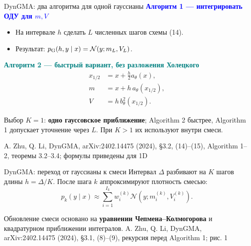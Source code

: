 \documentclass[10pt,aspectratio=169]{beamer}
\newcommand{\dynsrc}[1]{\vfill{\tiny\color{graytext}A. Zhu, Q. Li, DynGMA, arXiv:2402.14475 (2024), #1}}
\begin{document}
\begin{frame}{DynGMA: два алгоритма для одной гауссианы}
\vspace{0.10cm}
\textcolor{blue}{\bfseries Алгоритм 1 --- интегрировать ОДУ для $m,V$}
\begin{itemize}\setlength\itemsep{0.09cm}
\item На интервале $h$ сделать $L$ численных шагов схемы (14).
\item Результат: $p_{\rm G}(h,y\mid x)=\mathcal N(y;m_L,V_L)$.
\end{itemize}
\vspace{0.13cm}
\textcolor{teal}{\bfseries Алгоритм 2 --- быстрый вариант, без разложения Холецкого}
\[
\boxed{\begin{aligned}
 x_{1/2}&=x+\frac{h}{2}a_\theta(x),\\[-2pt]
 m&=x+h\,a_\theta(x_{1/2}),\\[-2pt]
 V&=h\,b_\theta^2(x_{1/2}).
\end{aligned}}
\]
\vspace{-0.08cm}
\begin{block}{Выбор}
$K=1$: \textbf{одно гауссовское приближение}; Algorithm 2 быстрее, Algorithm 1 допускает уточнение через $L$. При $K>1$ их используют внутри смеси.
\end{block}
\dynsrc{\S 3.2, (14)--(15), Algorithm 1--2, теоремы 3.2--3.4; формулы приведены для 1D}
\end{frame}

\begin{frame}{DynGMA: переход от гауссианы к смеси}
\vspace{0.09cm}
Интервал $\Delta$ разбивают на $K$ шагов длины $h=\Delta/K$.
\vspace{0.13cm}
После шага $k$ аппроксимируют плотность смесью:
\[
\boxed{\quad p_k(y\mid x)\approx \sum_{i=1}^{I_k} w_i^{(k)}
\mathcal N\!\left(y;m_i^{(k)},V_i^{(k)}\right).\quad}
\]
\vspace{0.15cm}
\begin{center}
\end{center}
\vspace{0.13cm}
\small Обновление смеси основано на \textbf{уравнении Чепмена--Колмогорова} и квадратурном приближении интегралов.
\dynsrc{\S 3.1, (8)--(9), рекурсия перед Algorithm 1; рис. 1}
\end{frame}
\end{document}
